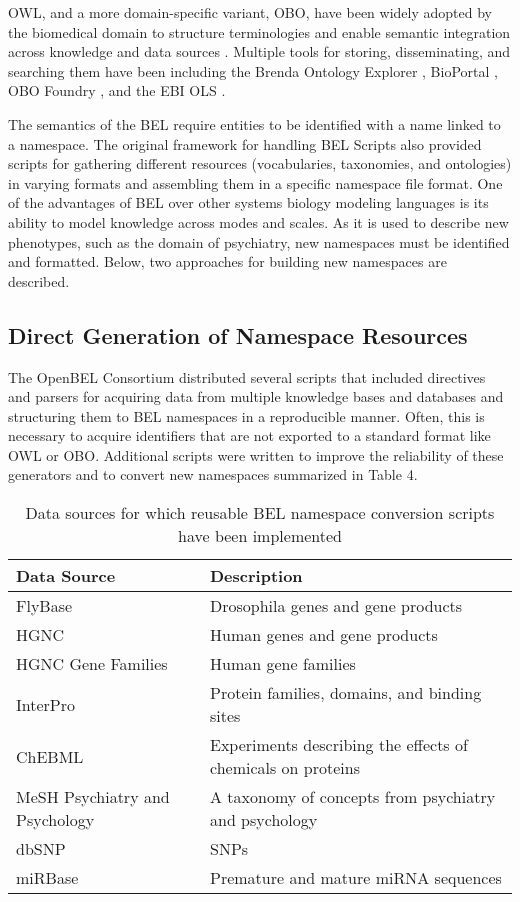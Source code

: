 OWL, and a more domain-specific variant, \ac{OBO}, have been widely adopted by the biomedical domain to structure terminologies and enable semantic integration across knowledge and data sources \cite{Smith2007}. Multiple tools for storing, disseminating, and searching them have been including the Brenda Ontology Explorer \cite{brendaontologyexplorer}, BioPortal \cite{Whetzel2011}, OBO Foundry \cite{Smith2007}, and the EBI \ac{OLS} \cite{Cote2006}.

The semantics of the \ac{BEL} require entities to be identified with a name linked to a namespace. The original framework for handling \ac{BEL} Scripts also provided scripts for gathering different resources (vocabularies, taxonomies, and ontologies) in varying formats and assembling them in a specific namespace file format. One of the advantages of BEL over other systems biology modeling languages is its ability to model knowledge across modes and scales. As it is used to describe new phenotypes, such as the domain of psychiatry, new namespaces must be identified and formatted. Below, two approaches for building new namespaces are described.

\subsection{Direct Generation of Namespace Resources}

The OpenBEL Consortium distributed several scripts that included directives and parsers for acquiring data from multiple knowledge bases and databases and structuring them to BEL namespaces in a reproducible manner. Often, this is necessary to acquire identifiers that are not exported to a standard format like OWL or OBO. Additional scripts were written to improve the reliability of these generators and to convert new namespaces summarized in Table 4.

\begin{table}
\centering
\caption[Direct Namespace Generation]{Data sources for which reusable BEL namespace conversion scripts have been implemented}
\label{tab:direct_namespace_generation}
\def\arraystretch{1.2}
\begin{tabular}{p{5cm} p{10cm}}
Data Source & Description \\
\hline
FlyBase & Drosophila genes and gene products \\
HGNC & Human genes and gene products \\
HGNC Gene Families & Human gene families \\
InterPro & Protein families, domains, and binding sites \\
ChEBML & Experiments describing the effects of chemicals on proteins \\
MeSH Psychiatry and Psychology & A taxonomy of concepts from psychiatry and psychology  \\
dbSNP & \ac{SNP}s \\
miRBase & Premature and mature \ac{miRNA} sequences
\end{tabular}
\end{table}

